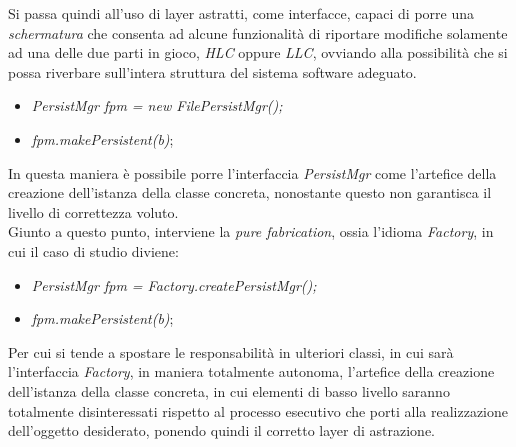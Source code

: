 \documentclass{article}
\begin{document}
Si passa quindi all'uso di layer astratti, come interfacce, capaci di porre una \textit{schermatura} che consenta ad alcune funzionalità di riportare modifiche solamente ad una delle due parti in gioco, \textit{HLC} oppure \textit{LLC}, ovviando alla possibilità che si possa riverbare sull'intera struttura del sistema software adeguato.
\begin{itemize}[label={ }, leftmargin=1cm]
    \itemsep0em
    \item \textit{PersistMgr fpm = new FilePersistMgr();}
    \item \textit{fpm.makePersistent(b)};
\end{itemize}
In questa maniera è possibile porre l'interfaccia \textit{PersistMgr} come l'artefice della creazione dell'istanza della classe concreta, nonostante questo non garantisca il livello di correttezza voluto.\vspace*{14pt}\\
Giunto a questo punto, interviene la \textit{pure fabrication}, ossia l'idioma \textit{Factory}, in cui il caso di studio diviene:
\begin{itemize}[label={ }, leftmargin=1cm]
    \itemsep0em
    \item \textit{PersistMgr fpm = Factory.createPersistMgr();}
    \item \textit{fpm.makePersistent(b)};
\end{itemize}
Per cui si tende a spostare le responsabilità in ulteriori classi, in cui sarà l'interfaccia \textit{Factory}, in maniera totalmente autonoma, l'artefice della creazione dell'istanza della classe concreta, in cui elementi di basso livello saranno totalmente disinteressati rispetto al processo esecutivo che porti alla realizzazione dell'oggetto desiderato, ponendo quindi il corretto layer di astrazione. 
\end{document}
